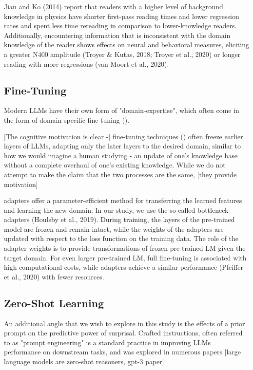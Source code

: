 \documentclass[10pt,letterpaper]{article}
\begin{document}
Jian and Ko (2014) report that readers with a higher level of background knowledge in physics have shorter first-pass reading times and lower regression rates and spent less time rereading in comparison to lower-knowledge readers. Additionally, encountering information that is inconsistent with the domain knowledge of the reader shows effects on neural and behavioral measures, eliciting a greater N400 amplitude (Troyer \& Kutas, 2018; Troyer et al., 2020) or longer reading with more regressions (van Moort et al., 2020).

\subsection{Fine-Tuning}

Modern LLMs have their own form of "domain-expertise", which often come in the form of domain-specific fine-tuning ().

[The cognitive motivation is clear -] fine-tuning techniques () often freeze earlier layers of LLMs, adapting only the later layers to the desired domain, similar to how we would imagine a human studying - an update of one's knowledge base without a complete overhaul of one's existing knowledge.
While we do not attempt to make the claim that the two processes are the same, [they provide motivation]

adapters offer a parameter-efficient method for transferring the learned features and learning the new domain. In our study, we use the so-called bottleneck adapters (Houlsby et al., 2019). During training, the layers of the pre-trained model are frozen and remain intact, while the weights of the adapters are updated with respect to the loss function on the training data. The role of the adapter weights is to provide transformations of frozen pre-trained LM given the target domain. For even larger pre-trained LM, full fine-tuning is associated with high computational costs, while adapters achieve a similar performance (Pfeiffer et al., 2020) with fewer resources.

\subsection{Zero-Shot Learning}

An additional angle that we wish to explore in this study is the effects of a prior prompt on the predictive power of surprisal.
Crafted instructions, often referred to as "prompt engineering" is a standard practice in improving LLMs performance on downstream tasks, and was explored in numerous papers [large language models are zero-shot reasoners, gpt-3 paper]
\end{document}

